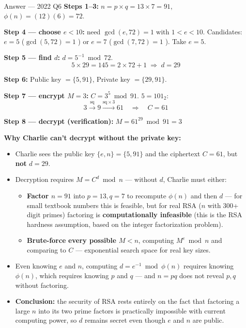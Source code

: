 \documentclass[12pt,a4paper]{article}
\begin{document}
\begin{solbox}{Answer --- 2022 Q6}
\textbf{Steps 1--3:} $n=p\times q=13\times7=\boxed{91}$, \quad $\phi(n)=(12)(6)=\boxed{72}$.

\textbf{Step 4 --- choose $e<10$:} need $\gcd(e,72)=1$ with $1<e<10$. Candidates: $e=5$ ($\gcd(5,72)=1$ \checkmark) or $e=7$ ($\gcd(7,72)=1$ \checkmark). Take $\boxed{e=5}$.

\textbf{Step 5 --- find $d$:} $d=5^{-1}\bmod72$.
\[
5\times29=145=2\times72+1 \;\Rightarrow\; d=\boxed{29}
\]

\textbf{Step 6:} Public key $=\{5,91\}$, Private key $=\{29,91\}$.

\textbf{Step 7 --- encrypt $M=3$:} $C=3^5\bmod91$. $5=101_2$:
\[
3 \xrightarrow{\text{sq}} 9 \xrightarrow{\text{sq}\times3} 61 \quad\Rightarrow\quad C=\boxed{61}
\]

\textbf{Step 8 --- decrypt (verification):} $M=61^{29}\bmod91=\boxed{3}$ \checkmark

\vspace{4pt}
\textbf{Why Charlie can't decrypt without the private key:}
\begin{itemize}[noitemsep]
  \item Charlie sees the public key $\{e,n\}=\{5,91\}$ and the ciphertext $C=61$, but \textbf{not} $d=29$.
  \item Decryption requires $M=C^d\bmod n$ --- without $d$, Charlie must either:
  \begin{itemize}[noitemsep]
    \item \textbf{Factor $n=91$} into $p=13,q=7$ to recompute $\phi(n)$ and then $d$ --- for small textbook numbers this is feasible, but for real RSA ($n$ with 300+ digit primes) factoring is \textbf{computationally infeasible} (this is the RSA hardness assumption, based on the integer factorization problem).
    \item \textbf{Brute-force every possible $M<n$}, computing $M^e\bmod n$ and comparing to $C$ --- exponential search space for real key sizes.
  \end{itemize}
  \item Even knowing $e$ and $n$, computing $d=e^{-1}\bmod\phi(n)$ requires knowing $\phi(n)$, which requires knowing $p$ and $q$ --- and $n=pq$ does not reveal $p,q$ without factoring.
  \item \textbf{Conclusion:} the security of RSA rests entirely on the fact that factoring a large $n$ into its two prime factors is practically impossible with current computing power, so $d$ remains secret even though $e$ and $n$ are public.
\end{itemize}
\end{solbox}
\end{document}
